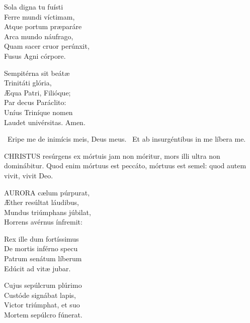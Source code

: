 Sola digna tu fuísti\\
Ferre mundi víctimam,\\
Atque portum præparáre\\
Arca mundo náufrago,\\
Quam sacer cruor perúnxit,\\
Fusus Agni córpore.

Sempitérna sit beátæ\\
Trinitáti glória,\\
Æqua Patri, Filióque;\\
Par decus Paráclito:\\
Uníus Triníque nomen\\
Laudet univérsitas. Amen.

\V\ Eripe me de inimícis meis, Deus meus. \R\ Et ab insurgéntibus in me líbera me.





\lettrine[lines=2]{C}{HRISTUS} resúrgens ex mórtuis jam non móritur, mors illi ultra non dominábitur. Quod enim mórtuus est peccáto, mórtuus est semel: quod autem vivit, vivit Deo.



\lettrine[lines=2]{A}{URORA} cælum púrpurat,\\
Æther resúltat láudibus,\\
Mundus triúmphans júbilat,\\
Horrens avérnus ínfremit:

Rex ille dum fortíssimus\\
De mortis inférno specu\\
Patrum senátum líberum\\
Edúcit ad vitæ jubar.

Cujus sepúlcrum plúrimo\\
Custóde signábat lapis,\\
Victor triúmphat, et suo\\
Mortem sepúlcro fúnerat.

